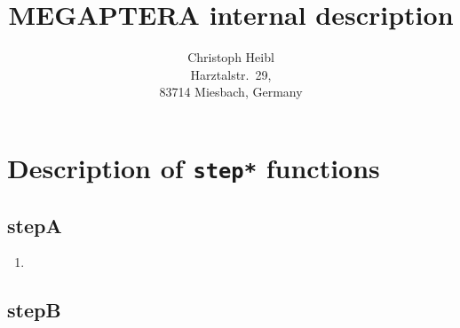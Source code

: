 \documentclass[12pt]{article}
\title{MEGAPTERA internal description}
\author{Christoph Heibl\\Harztalstr.~29,\\83714 Miesbach, Germany}
\begin{document}
\maketitle
\tableofcontents

\newpage
\section{Description of \texttt{step*} functions}

\subsection{stepA}

\begin{enumerate}
\item 
\end{enumerate}

\subsection{stepB}
\end{document}
